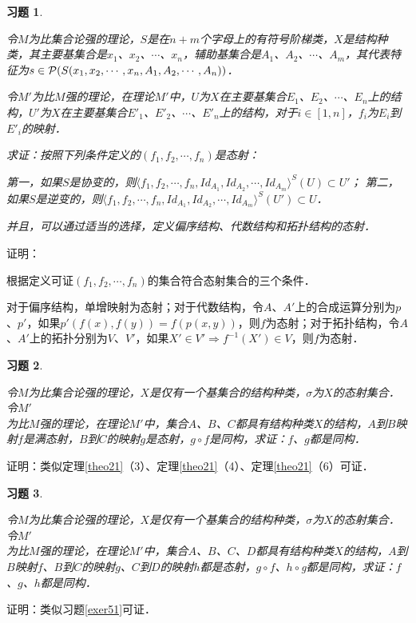 \documentclass[12pt, a4paper, oneside]{book}
\newtheorem{exer}{习题}
\begin{document}
			\begin{exer}\label{exer200}
				\hfill\par
				令$M$为比集合论强的理论，$S$是在$n+m$个字母上的有符号阶梯类，$X$是结构种类，其主要基集合是$x_1$、$x_2$、$\cdots$、$x_n$，辅助基集合是$A_1$、$A_2$、$\cdots$、$A_m$，其代表特征为$s\in \mathcal{P}(S(x_1, \\x_2, \cdots, x_n, A_1, A_2, \cdots, \\A_n))$．
				\par
				令$M'$为比$M$强的理论，在理论$M'$中，$U$为$X$在主要基集合$E_1$、$E_2$、$\cdots$、$E_n$上的结构，$U'$为$X$在主要基集合${E'}_1$、${E'}_2$、$\cdots$、${E'}_n$上的结构，对于$i\in [1, n]$，$f_i$为$E_i$到${E'}_i$的映射．
				\par
				求证：按照下列条件定义的$(f_1, f_2, \cdots, f_n)$是态射：
				\par
				第一，如果$S$是协变的，则$\langle f_1, f_2, \cdots, f_n, Id_{A_1}, Id_{A_2}, \cdots, Id_{A_m}\rangle ^S(U)\subset U'$；
				第二，如果$S$是逆变的，则$\langle f_1, f_2, \cdots, f_n, Id_{A_1}, Id_{A_2}, \cdots, Id_{A_m}\rangle ^S(U')\subset U$．
				\par
				并且，可以通过适当的选择，定义偏序结构、代数结构和拓扑结构的态射．
			\end{exer}
			证明：
			\par
			根据定义可证$(f_1, f_2, \cdots, f_n)$的集合符合态射集合的三个条件．
			\par
			对于偏序结构，单增映射为态射；对于代数结构，令$A$、$A'$上的合成运算分别为$p$、$p'$，如果$p'(f(x), f(y))=f(p(x, y))$，则$f$为态射；对于拓扑结构，令$A$、$A'$上的拓扑分别为$V$、$V'$，如果$X'\in V'\Rightarrow f^{-1}(X')\in V$，则$f$为态射．
			
			\begin{exer}\label{exer201}
				\hfill\par
				令$M$为比集合论强的理论，$X$是仅有一个基集合的结构种类，$\sigma$为$X$的态射集合．令$M'$\\为比$M$强的理论，在理论$M'$中，集合$A$、$B$、$C$都具有结构种类$X$的结构，$A$到$B$映射$f$是满态射，$B$到$C$的映射$g$是态射，$g\circ f$是同构，求证：$f$、$g$都是同构．
			\end{exer}
			证明：类似定理\ref{theo21}（3）、定理\ref{theo21}（4）、定理\ref{theo21}（6）可证．
			
			\begin{exer}\label{exer202}
				\hfill\par
				令$M$为比集合论强的理论，$X$是仅有一个基集合的结构种类，$\sigma$为$X$的态射集合．令$M'$\\为比$M$强的理论，在理论$M'$中，集合$A$、$B$、$C$、$D$都具有结构种类$X$的结构，$A$到$B$映射$f$、$B$到$C$的映射$g$、$C$到$D$的映射$h$都是态射，$g\circ f$、$h\circ $g都是同构，求证：$f$、$g$、$h$都是同构．
			\end{exer}
			证明：类似习题\ref{exer51}可证．
			
\end{document}
